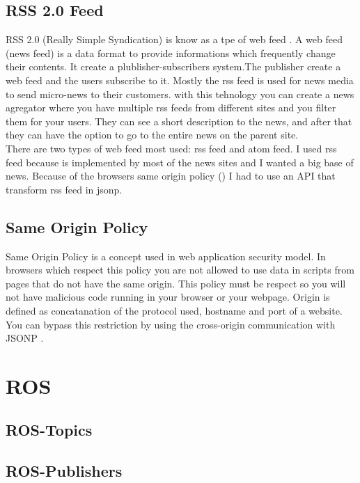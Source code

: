 \subsection{RSS 2.0 Feed}
\label{sub-sec:tbkg-rss}
RSS 2.0 (Really Simple Syndication) \cite{board2014rss} is know as a tpe of web feed \cite{downing2008web}.
A web feed (news feed) is a data format to provide informations which frequently change their contents.
It create a plublisher-subscribers system.The publisher create a web feed and the users subscribe to it.
Mostly the rss feed is used for news media to send micro-news to their customers. with this tehnology you can
create a news agregator where you have multiple rss feeds from different sites and you filter them for your users.
They can see a short description to the news, and after that they can have the option to go to the entire news
on the parent site. \\
There are two types of web feed most used: rss feed and atom feed. I used rss feed because is implemented by most
of the news sites and I wanted a big base of news. Because of the browsers same origin policy ()
 I had to use an API that transform rss feed in jsonp.


\subsection{Same Origin Policy}
\label{sub-sec:tbkg-sameorigin}
Same Origin Policy \cite{network10same} is a concept used in web application security model. In browsers which respect this policy
you are not allowed to use data in scripts from pages that do not have the same origin. This policy must be respect so you will not have
malicious code running in your browser or your webpage. Origin is defined as concatanation of
the protocol used, hostname and port of a website. You can bypass this restriction by using the cross-origin communication
with JSONP \cite{ozses2009cross}.

\section{ROS}
\label{sec:ros}

\subsection{ROS-Topics}
\label{sub-sec:ros-topics}
\subsection{ROS-Publishers}
\label{sub-sec:ros-publisher}
